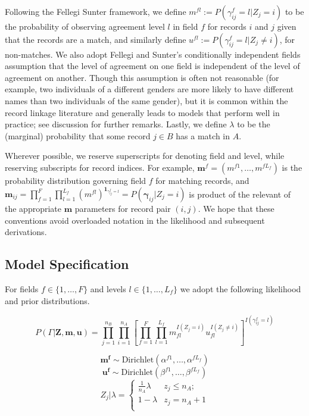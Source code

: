 \documentclass[12pt,letterpaper]{article}
\newcommand{\1}[1]{\mathbb{I}\!\left[#1\right]} %
\begin{document}
Following the Fellegi Sunter framework, we define
\(m^{fl}:= P(\gamma_{ij}^f = l |Z_j = i)\) to be the probability of
observing agreement level \(l\) in field \(f\) for records \(i\) and
\(j\) given that the records are a match, and similarly define
\(u^{fl}:= P(\gamma_{ij}^f = l |Z_j \neq i)\), for non-matches. We also
adopt Fellegi and Sunter's conditionally independent fields assumption
that the level of agreement on one field is independent of the level of
agreement on another. Though this assumption is often not reasonable
(for example, two individuals of a different genders are more likely to have different names than two individuals of the same gender),
but it is common within the record linkage literature and generally
leads to models that perform well in practice; see discussion for
further remarks. Lastly, we define \(\lambda\) to be the (marginal)
probability that some record \(j \in B\) has a match in \(A\).

Wherever possible, we reserve superscripts for denoting field and level,
while reserving subscripts for record indices. For example,
\(\mathbf{m}^f = (m^{f1}, \ldots, m^{fL_f})\) is the probability
distribution governing field \(f\) for matching records, and
\(\mathbf{m}_{ij}= \prod_{f=1}^{F}\prod_{l=1}^{L_f} \left(m^{fl}\right)^{\mathbf{1}_{\gamma_{ij}^f = l}} = P(\boldsymbol{\gamma}_{ij}|Z_j = i)\)
is product of the relevant of the appropriate \(\mathbf{m}\) parameters
for record pair \((i,j)\). We hope that these conventions avoid
overloaded notation in the likelihood and subsequent derivations.

\hypertarget{model-specification}{%
	\subsection{Model Specification}
	\label{model-specification}}

For fields \(f \in \{1, \ldots, F\}\) and levels
\(l\in \{1, \ldots, L_f\}\) we adopt the following likelihood and prior
distributions.


$$P(\Gamma|\mathbf{Z}, \mathbf{m}, \mathbf{u}) = \prod_{j=1}^{n_B}  \prod_{i=1}^{n_A}\left[ \prod_{f=1}^{F}\prod_{l=1}^{L_f} m_{fl}^{I(Z_j = i)}u_{fl}^{I(Z_j \neq i)}\right]^{I(\gamma_{ij}^f = l)}$$

\[\mathbf{m^{f}} \sim \text{Dirichlet}(\alpha^{f1}, \ldots, \alpha^{fL_f})\]
\[\mathbf{u^{f}} \sim \text{Dirichlet}(\beta^{f1}, \ldots, \beta^{fL_f})\]
\[Z_j | \lambda =
\begin{cases} 
	\frac{1}{n_A}\lambda  & z_j \leq n_A; \\
	1-\lambda &  z_j  = n_A + 1 \\
\end{cases}\]
\end{document}
